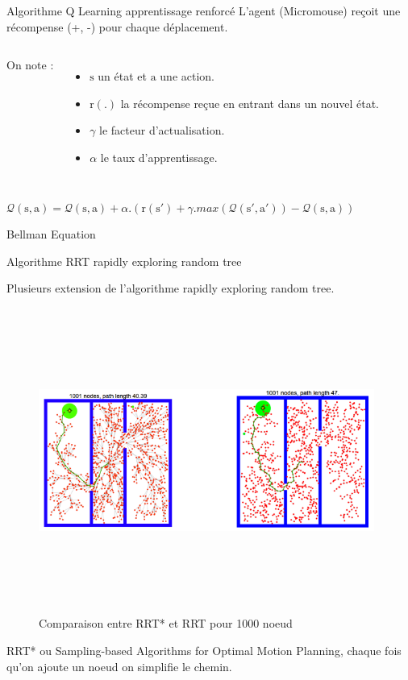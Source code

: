 \documentclass{beamer}
\begin{document}
\begin{frame}{Algorithme Q Learning apprentissage renforcé}
L'agent (Micromouse) reçoit une récompense (+, -) pour chaque déplacement.

\begin{columns}[c]


On note :
\begin{itemize}
    \item $\mathrm{s}$ un état et $\mathrm{a}$ une action.
    \item $\mathrm{r(.)}$ la récompense reçue en entrant dans un nouvel état.
    \item $\gamma$ le facteur d'actualisation.
    \item $\alpha$ le taux d'apprentissage.
\end{itemize}

\end{columns}

\begin{center}
\large{
$\mathcal{Q}(\mathrm{s},\mathrm{a}) = \mathcal{Q}(\mathrm{s},\mathrm{a}) + \alpha . (\mathrm{r}(\mathrm{s'}) + \gamma . max(\mathcal{Q}(\mathrm{s'},\mathrm{a'})) - \mathcal{Q}(\mathrm{s},\mathrm{a}))$}

\color{red}
Bellman Equation
\end{center}

\end{frame}

\begin{frame}{Algorithme RRT rapidly exploring random tree}

Plusieurs extension de l'algorithme rapidly exploring random tree.

\begin{figure}
    \centering
    \includegraphics[width=11cm,height=10cm,keepaspectratio]{pics/rrt_rrtstar.png}
    \caption{Comparaison entre RRT* et RRT pour 1000 noeud}
\end{figure}

RRT* ou Sampling-based Algorithms for Optimal Motion Planning, chaque fois qu'on ajoute un noeud on simplifie le chemin.

\end{frame}
\end{document}
